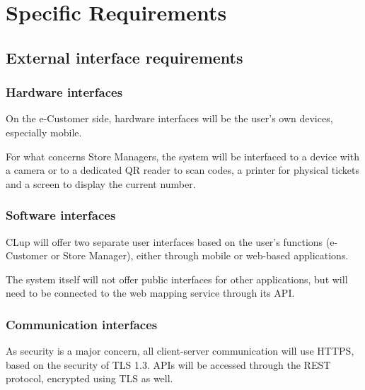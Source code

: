 
\section{Specific Requirements}
\label{sect:requirements}

\subsection{External interface requirements}



\subsubsection{Hardware interfaces}
On the e-Customer side, hardware interfaces will be the user's own devices, especially mobile.

For what concerns Store Managers, the system will be interfaced to a device with a camera or to a dedicated QR reader to scan codes, a printer for physical tickets and a screen to display the current number.

\subsubsection{Software interfaces}
CLup will offer two separate user interfaces based on the user's functions (e-Customer or Store Manager), either through mobile or web-based applications. 

The system itself will not offer public interfaces for other applications, but will need to be connected to the web mapping service through its API.

\subsubsection{Communication interfaces}
As security is a major concern, all client-server communication will use HTTPS, based on the security of TLS 1.3. APIs will be accessed through the REST protocol, encrypted using TLS as well.












